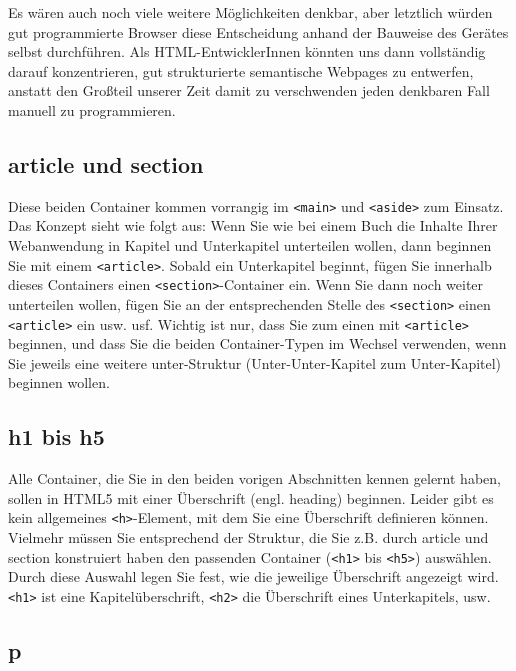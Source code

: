 Es wären auch noch viele weitere Möglichkeiten denkbar, aber letztlich würden gut programmierte Browser diese Entscheidung anhand der Bauweise des Gerätes selbst durchführen. Als HTML-EntwicklerInnen könnten uns dann vollständig darauf konzentrieren, gut strukturierte semantische Webpages zu entwerfen, anstatt den Großteil unserer Zeit damit zu verschwenden jeden denkbaren Fall manuell zu programmieren.

\subsection{article und section}

Diese beiden Container kommen vorrangig im \verb|<main>| und \verb|<aside>| zum Einsatz. Das Konzept sieht wie folgt aus: Wenn Sie wie bei einem Buch die Inhalte Ihrer Webanwendung in Kapitel und Unterkapitel unterteilen wollen, dann beginnen Sie mit einem \verb|<article>|. Sobald ein Unterkapitel beginnt, fügen Sie innerhalb dieses Containers einen \verb|<section>|-Container ein. Wenn Sie dann noch weiter unterteilen wollen, fügen Sie an der entsprechenden Stelle des \verb|<section>| einen \verb|<article>| ein usw. usf. Wichtig  ist nur, dass Sie zum einen mit \verb|<article>| beginnen, und dass Sie die beiden Container-Typen im Wechsel verwenden, wenn Sie jeweils eine weitere unter-Struktur (Unter-Unter-Kapitel zum Unter-Kapitel) beginnen wollen.

\subsection{h1 bis h5}

Alle Container, die Sie in den beiden vorigen Abschnitten kennen gelernt haben, sollen in HTML5 mit einer Überschrift (engl. heading) beginnen. Leider gibt es kein allgemeines \verb|<h>|-Element, mit dem Sie eine Überschrift definieren können.\\

Vielmehr müssen Sie entsprechend der Struktur, die Sie z.B. durch article und section konstruiert haben den passenden Container (\verb|<h1>| bis \verb|<h5>|) auswählen. Durch diese Auswahl legen Sie fest, wie die jeweilige Überschrift angezeigt wird. \verb|<h1>| ist eine Kapitelüberschrift, \verb|<h2>| die Überschrift eines Unterkapitels, usw.

\subsection{p}

